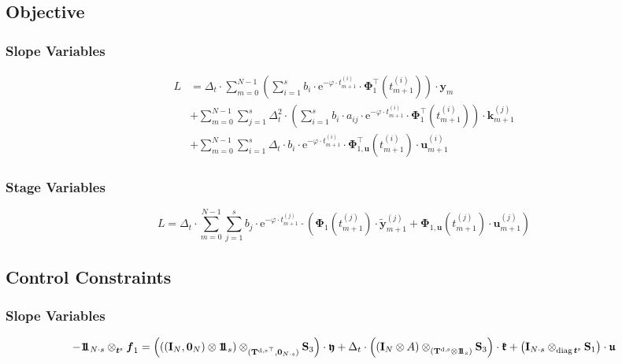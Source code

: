 \documentclass{article}
\newcommand{\tp}{\top}%
\newcommand{\kron}{\otimes}%
\newcommand{\dkron}[2][]{\mathbin{\kron_{#2}^{#1}}}%
\newcommand{\expe}{\mathrm{e}}%
\newcommand{\diag}{\mathop{\mathrm{diag}}}%
\newcommand{\vectorfont}[1]{\boldsymbol{#1}}%
\newcommand{\greekvectorfont}[1]{\boldsymbol{#1}}%
\newcommand{\matrixfont}[1]{\mathbf{#1}}%
\newcommand{\fvec}{\vectorfont{f}}
\newcommand{\kvec}{\vectorfont{k}}
\newcommand{\tvec}{\vectorfont{t}}
\newcommand{\uvec}{\vectorfont{u}}
\newcommand{\yvec}{\vectorfont{y}}
\newcommand{\tildeyvec}{\vectorfont{\tilde{y}}}
\newcommand{\Phivec}{\greekvectorfont{\Phi}}
\newcommand{\kfrakvec}{\vectorfont{\mathfrak{k}}}
\newcommand{\ufrakvec}{\vectorfont{\mathfrak{u}}}
\newcommand{\yfrakvec}{\vectorfont{\mathfrak{y}}}
\newcommand{\nullvec}{\greekvectorfont{0}}
\newcommand{\einsvec}{\vectorfont{1}\negthinspace\negthinspace\vectorfont{1}} %
\newcommand{\Imat}{\matrixfont{I}}%
\newcommand{\Smat}{\matrixfont{S}}
\newcommand{\Tmat}{\matrixfont{T}}
\begin{document}
\subsection*{Objective}
\subsubsection*{Slope Variables}
\begin{align*}
L &= \Delta_t \cdot \sum_{m=0}^{N-1} \left(\sum_{i=1}^s b_i \cdot \expe^{-\varphi \cdot t_{m+1}^{(i)}} \cdot \Phivec_1^{\tp} (t_{m+1}^{(i)}) \right) \cdot \yvec_{m} \\
 &+ \sum_{m=0}^{N-1} \sum_{j=1}^s \Delta_t^2 \cdot \left(\sum_{i=1}^s b_i \cdot a_{ij} \cdot \expe^{-\varphi \cdot t_{m+1}^{(i)}} \cdot \Phivec_1^{\tp} (t_{m+1}^{(i)}) \right) \cdot \kvec_{m+1}^{(j)} \\
 &+ \sum_{m=0}^{N-1} \sum_{i=1}^s \Delta_t \cdot b_i \cdot \expe^{-\varphi \cdot t_{m+1}^{(i)}} \cdot \Phivec_{1,\uvec}^{\tp}(t_{m+1}^{(i)}) \cdot \uvec_{m+1}^{(i)}
\end{align*}

\subsubsection*{Stage Variables}
\[
L = \Delta_t \cdot \sum_{m=0}^{N-1} \sum_{j=1}^s b_j \cdot \expe^{-\varphi \cdot t_{m+1}^{(j)}} \cdot \left(\Phivec_1(t_{m+1}^{(j)})\cdot \tildeyvec_{m+1}^{(j)} + \Phivec_{1,\uvec}(t_{m+1}^{(j)}) \cdot \uvec_{m+1}^{(j)}\right) 
\]


\subsection*{Control Constraints}
\subsubsection*{Slope Variables}
\[
-\einsvec_{N\cdot s} \dkron{\tvec^{\mathrm{s}}} \fvec_1
 = \left( \left( (\Imat_{N}, \nullvec_N) \kron \einsvec_s\right) \dkron{({\Tmat^{\mathrm{d},\mathrm{s}}}^{\tp},\nullvec_{N \cdot s})} \Smat_3 \right) \cdot \yfrakvec
 + \Delta_t \cdot \left(  (\Imat_{N} \kron A) \dkron{(\Tmat^{\mathrm{d},\mathrm{s}} \kron \einsvec_s)} \Smat_3 \right)\cdot \kfrakvec
 + \left(\Imat_{N \cdot s} \dkron{\diag \tvec^{\mathrm{s}}} \Smat_1  \right) \cdot \ufrakvec
\]
\end{document}
